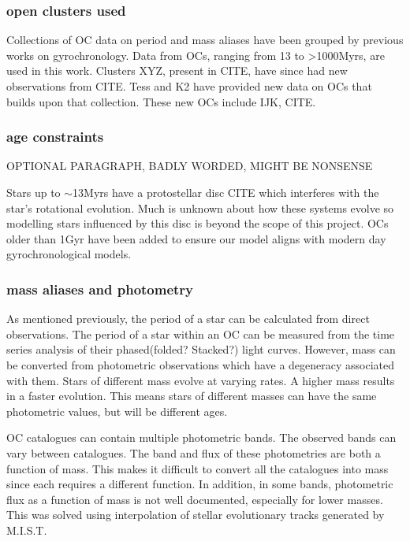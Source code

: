\documentclass[fleqn,usenatbib]{mnras}
\begin{document}
\subsubsection{open clusters used}
Collections of OC data on period and mass aliases have been grouped by previous works on gyrochronology.
Data from OCs, ranging from 13 to >1000Myrs, are used in this work.
Clusters XYZ, present in CITE, have since had new observations from CITE.
Tess and K2 have provided new data on OCs that builds upon that collection.
These new OCs include IJK, CITE. 

\subsubsection{age constraints}
OPTIONAL PARAGRAPH, BADLY WORDED, MIGHT BE NONSENSE

Stars up to $\sim$13Myrs have a protostellar disc CITE which interferes with the star’s rotational evolution.
Much is unknown about how these systems evolve so modelling stars influenced by this disc is beyond the scope of this project.
OCs older than 1Gyr have been added to ensure our model aligns with modern day gyrochronological models. 


\subsubsection{mass aliases and photometry}

As mentioned previously, the period of a star can be calculated from direct observations.
The period of a star within an OC can be measured from the time series analysis of their phased(folded? Stacked?) light curves.
However, mass can be converted from photometric observations which have a degeneracy associated with them.
Stars of different mass evolve at varying rates.
A higher mass results in a faster evolution.
This means stars of different masses can have the same photometric values, but will be different ages.

OC catalogues can contain multiple photometric bands.
The observed bands can vary between catalogues.
The band and flux of these photometries are both a function of mass.
This makes it difficult to convert all the catalogues into mass since each requires a different function.
In addition, in some bands, photometric flux as a function of mass is not well documented, especially for lower masses.
This was solved using interpolation of stellar evolutionary tracks generated by M.I.S.T.
\end{document}
